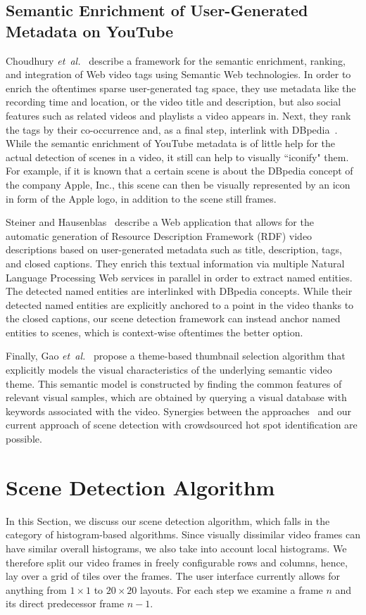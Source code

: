 \documentclass[10pt,twocolumn,letterpaper]{article}
\begin{document}
\subsection{Semantic Enrichment of User-Generated Metadata on YouTube}
Choudhury \emph{et~al.}~\cite{Choudhury:YouTube} describe a framework for the semantic enrichment, ranking, and integration of Web video tags using Semantic Web technologies. In order to enrich the oftentimes sparse user-generated tag space, they use metadata like the recording time and location, or the video title and description, but also social features such as related videos and playlists a video appears in. Next, they rank the tags by their co-occurrence and, as a final step, interlink with DBpedia~\cite{Bizer:DBpedia}. While the semantic enrichment of YouTube metadata is of little help for the actual detection of scenes in a video, it still can help to visually ``iconify" them. For example, if it is known that a certain scene is about the DBpedia concept of the company Apple, Inc., this scene can then be visually represented by an icon in form of the Apple logo, in addition to the scene still frames.

Steiner and Hausenblas~\cite{semwebvid} describe a Web application that allows for the automatic generation of Resource Description Framework (RDF) video descriptions based on user-generated metadata such as title, description, tags, and closed captions. They enrich this textual information via multiple Natural Language Processing Web services in parallel in order to extract named entities. The detected named entities are interlinked with DBpedia concepts. While their detected named entities are explicitly anchored to a point in the video thanks to the closed captions, our scene detection framework can instead anchor named entities to scenes, which is context-wise oftentimes the better option.

Finally, Gao \emph{et~al.}~\cite{Gao:2009} propose a theme-based thumbnail selection algorithm that explicitly models the visual characteristics of the underlying semantic video theme. This semantic model is constructed by finding the common features of relevant visual samples, which are obtained by querying a visual database with keywords associated with the video. Synergies between the approaches~\cite{Choudhury:YouTube,Gao:2009,semwebvid} and our current approach of scene detection with crowdsourced hot spot identification are possible.

\section{Scene Detection Algorithm} \label{sec:details-of-algo}
In this Section, we discuss our scene detection algorithm, which falls in the category of histogram-based algorithms.  Since visually dissimilar video frames can have similar overall histograms, we also take into account local histograms. 
We therefore split our video frames in freely configurable rows and columns, hence, lay over a grid of tiles over the frames. The user interface currently allows for anything from $1 \times 1$ to $20 \times 20$ layouts. For each step we examine a frame $n$ and its direct predecessor frame $n - 1$.
\end{document}
